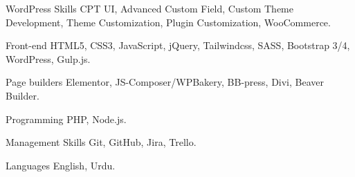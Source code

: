 

\begin{cvskills}
  \cvskill
    {WordPress Skills} %
    {CPT UI, Advanced Custom Field, Custom Theme Development, Theme Customization, Plugin Customization, WooCommerce.}  %

  \cvskill
    {Front-end} %
    {HTML5, CSS3, JavaScript, jQuery, Tailwindcss, SASS, Bootstrap 3/4, WordPress, Gulp.js.} %

  \cvskill
    {Page builders } %
    {Elementor, JS-Composer/WPBakery, BB-press, Divi, Beaver Builder.  } %

  \cvskill
    {Programming} %
    {PHP, Node.js.} %

  \cvskill
    {Management Skills} %
    {Git, GitHub, Jira, Trello.} %

  \cvskill
    {Languages} %
    {English, Urdu.} %

\end{cvskills}
